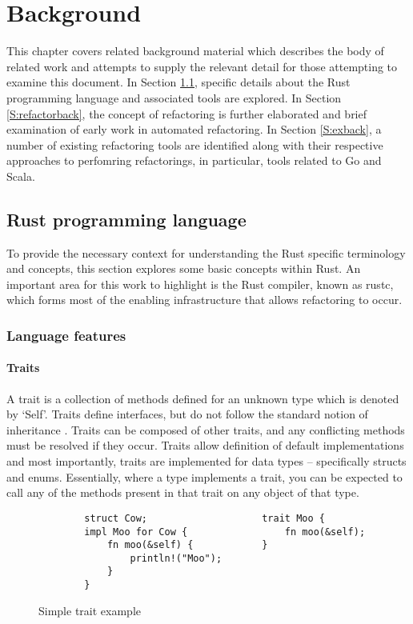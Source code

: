\chapter{Background}\label{C:back} 
This chapter covers related background material which describes the body of related work and attempts to supply the relevant detail for those attempting to examine this document. In Section \ref{S:rustback}, specific details about the Rust programming language and associated tools are explored. In Section \ref{S:refactorback}, the concept of refactoring is further elaborated and brief examination of early work in automated refactoring. In Section \ref{S:exback}, a number of existing refactoring tools are identified along with their respective approaches to perfomring refactorings, in particular, tools related to Go and Scala. 

\section{Rust programming language}\label{S:rustback}
To provide the necessary context for understanding the Rust specific terminology and concepts, this section explores some basic concepts within Rust. An important area for this work to highlight is the Rust compiler, known as rustc, which forms most of the enabling infrastructure that allows refactoring to occur.

\subsection{Language features}
\subsubsection{Traits}
A trait is a collection of methods defined for an unknown type which is denoted by `Self'. Traits define interfaces, but do not follow the standard notion of inheritance \cite{traitexample15}. Traits can be composed of other traits, and any conflicting methods must be resolved if they occur. Traits allow definition of default implementations and most importantly, traits are implemented for data types -- specifically structs and enums. Essentially, where a type implements a trait, you can be expected to call any of the methods present in that trait on any object of that type. 

\begin{figure}[H]
\centering
\begin{verbatim}
        struct Cow;                    trait Moo {
        impl Moo for Cow {                 fn moo(&self);    
            fn moo(&self) {            }
                println!("Moo");                     
            }
        }
\end{verbatim}
\caption{Simple trait example}
\end{figure}


